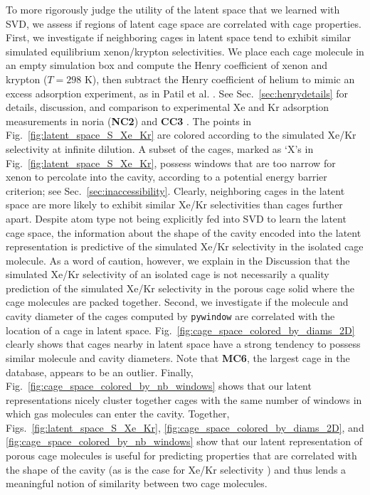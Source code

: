 \documentclass[journal=jacsat,manuscript=article,layout=traditional]{achemso}
\begin{document}
To more rigorously judge the utility of the latent space that we learned with SVD, we assess if regions of latent cage space are correlated with cage properties. First, we investigate if neighboring cages in latent space tend to exhibit similar simulated equilibrium xenon/krypton selectivities.
We place each cage molecule in an empty simulation box and compute the Henry coefficient of xenon and krypton ($T=298$ K), then subtract the Henry coefficient of helium to mimic an excess adsorption experiment, as in Patil et al. \cite{patil2016noria}. See Sec.~\ref{sec:henrydetails} for details, discussion, and comparison to experimental Xe and Kr adsorption measurements in noria (\textbf{NC2}) \cite{patil2016noria} and \textbf{CC3} \cite{chen2014separation}.
The points in Fig.~\ref{fig:latent_space_S_Xe_Kr} are colored according to the simulated Xe/Kr selectivity at infinite dilution. {\color{red} A subset of the cages, marked as `X's in Fig.~\ref{fig:latent_space_S_Xe_Kr}, possess windows that are too narrow for xenon to percolate into the cavity, according to a potential energy barrier criterion; see Sec.~\ref{sec:inaccessibility}.} Clearly, neighboring cages in the latent space are more likely to exhibit similar Xe/Kr selectivities than cages further apart. Despite atom type not being explicitly fed into SVD to learn the latent cage space, the information about the shape of the cavity encoded into the latent representation is predictive of the simulated Xe/Kr selectivity {\color{red} in the isolated cage molecule. As a word of caution, however, we explain in the Discussion that the simulated Xe/Kr selectivity of an isolated cage is not necessarily a quality prediction of the simulated Xe/Kr selectivity in the porous cage solid where the cage molecules are packed together.}
Second, we investigate if the molecule and cavity diameter of the cages computed by \texttt{pywindow} \cite{miklitz2018pywindow} are correlated with the location of a cage in latent space. Fig.~\ref{fig:cage_space_colored_by_diams_2D} clearly shows that cages nearby in latent space have a strong tendency to possess similar molecule and cavity diameters. Note that \textbf{MC6}, the largest cage in the database, appears to be an outlier. 
Finally, Fig.~\ref{fig:cage_space_colored_by_nb_windows} shows that our latent representations nicely cluster together cages with the same number of windows in which gas molecules can enter the cavity.
Together, Figs.~\ref{fig:latent_space_S_Xe_Kr}, \ref{fig:cage_space_colored_by_diams_2D}, and \ref{fig:cage_space_colored_by_nb_windows} show that our latent representation of porous cage molecules is useful for predicting properties that are correlated with the shape of the cavity (as is the case for Xe/Kr selectivity \cite{sikora2012thermodynamic,simon2015best}) and thus lends a meaningful notion of similarity between two cage molecules.
\end{document}
